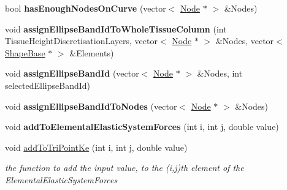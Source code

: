 \begin{DoxyCompactItemize}
\item 
\hypertarget{classShapeBase_abdb4b79809dfe5324af6cf590e12ca27}{}bool {\bfseries has\+Enough\+Nodes\+On\+Curve} (vector$<$ \hyperlink{classNode}{Node} $\ast$ $>$ \&Nodes)\label{classShapeBase_abdb4b79809dfe5324af6cf590e12ca27}

\item 
\hypertarget{classShapeBase_ab4411992f8433341d3087ed53581c0bc}{}void {\bfseries assign\+Ellipse\+Band\+Id\+To\+Whole\+Tissue\+Column} (int Tissue\+Height\+Discretisation\+Layers, vector$<$ \hyperlink{classNode}{Node} $\ast$ $>$ \&Nodes, vector$<$ \hyperlink{classShapeBase}{Shape\+Base} $\ast$ $>$ \&Elements)\label{classShapeBase_ab4411992f8433341d3087ed53581c0bc}

\item 
\hypertarget{classShapeBase_ace0432379342fb6664f67c467871e698}{}void {\bfseries assign\+Ellipse\+Band\+Id} (vector$<$ \hyperlink{classNode}{Node} $\ast$ $>$ \&Nodes, int selected\+Ellipse\+Band\+Id)\label{classShapeBase_ace0432379342fb6664f67c467871e698}

\item 
\hypertarget{classShapeBase_a4ffa720225ad34e81371fa82d979f261}{}void {\bfseries assign\+Ellipse\+Band\+Id\+To\+Nodes} (vector$<$ \hyperlink{classNode}{Node} $\ast$ $>$ \&Nodes)\label{classShapeBase_a4ffa720225ad34e81371fa82d979f261}

\item 
\hypertarget{classShapeBase_a677fceb50ab5626dbc9c4f8079829d59}{}void {\bfseries add\+To\+Elemental\+Elastic\+System\+Forces} (int i, int j, double value)\label{classShapeBase_a677fceb50ab5626dbc9c4f8079829d59}

\item 
\hypertarget{classShapeBase_a2e8e11261fb35bc925259151218eebf3}{}void \hyperlink{classShapeBase_a2e8e11261fb35bc925259151218eebf3}{add\+To\+Tri\+Point\+Ke} (int i, int j, double value)\label{classShapeBase_a2e8e11261fb35bc925259151218eebf3}

\begin{DoxyCompactList}\small\item\em the function to add the input value, to the (i,j)th element of the Elemental\+Elastic\+System\+Forces \end{DoxyCompactList}\end{DoxyCompactItemize}
